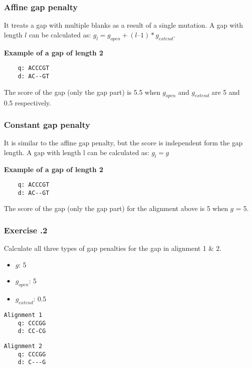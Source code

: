 %
%
\subsubsection*{Affine gap penalty}
It treats a gap with multiple blanks as a result of a single mutation. A gap with length $l$ can be calculated as: $g_l = g_{open} + (l – 1) * g_{extend}$.
\medskip 

\noindent
\textbf{Example of a gap of length 2}
\begin{verbatim}
    q: ACCCGT
    d: AC--GT
\end{verbatim}
The score of the gap (only the gap part) is 5.5 when $g_{open}$ and $g_{extend}$ are 5 and 0.5 respectively. 

%
%
\subsubsection*{Constant gap penalty}
It is similar to the affine gap penalty, but the score is independent form the gap length. A gap with length l can be calculated as: $g_l = g$ 
\medskip 

\noindent
\textbf{Example of a gap of length 2}
\begin{verbatim}
    q: ACCCGT
    d: AC--GT
\end{verbatim}
The score of the gap (only the gap part) for the alignment above is 5 when $g$ = 5. 

%
%
\subsubsection*{Exercise \thesection.2}
Calculate all three types of gap penalties for the gap in alignment 1 \& 2.

\begin{itemize}
\item $g$: 5
\item $g_{open}$: 5
\item $g_{extend}$: 0.5
\end{itemize}

\begin{multicols}{2}
\begin{verbatim}
Alignment 1
    q: CCCGG 
    d: CC-CG
\end{verbatim}

\begin{verbatim}
Alignment 2 
    q: CCCGG
    d: C---G
\end{verbatim}
\end{multicols}

\bigskip 

%
